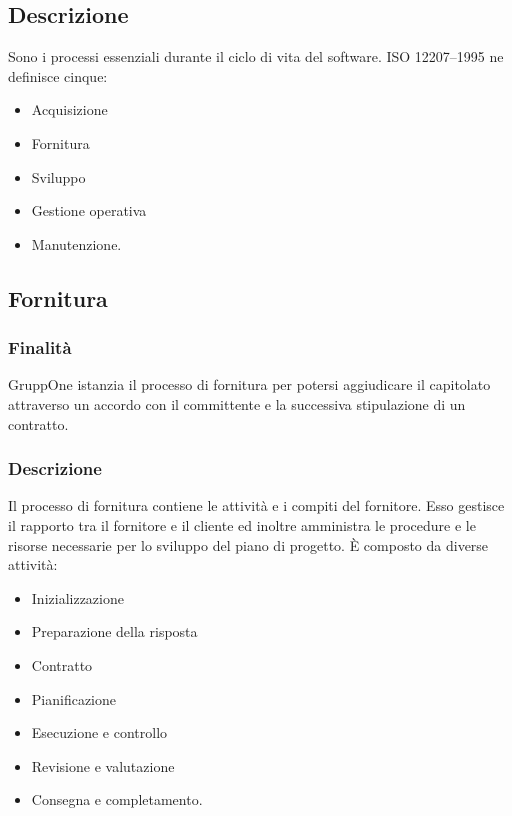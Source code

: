 \documentclass[../norme-di-progetto.tex]{subfiles}
\begin{document}
\subsection{Descrizione}%
\label{sub:processi_primari/descrizione}
Sono i processi essenziali durante il ciclo di vita del software. ISO 12207--1995 ne definisce cinque:

\begin{itemize}
  \item Acquisizione
  \item Fornitura
  \item Sviluppo
  \item Gestione operativa
  \item Manutenzione.
\end{itemize}

\subsection{Fornitura}%
\label{sub:fornitura}

\subsubsection{Finalità}%
\label{subs:fornitura/finalita}

GruppOne istanzia il processo di fornitura per potersi aggiudicare il capitolato attraverso un accordo con il committente e la successiva stipulazione di un contratto.

\subsubsection{Descrizione}%
\label{subs:fornitura/descrizione}

Il processo di fornitura contiene le attività e i compiti del fornitore. Esso gestisce il rapporto tra il fornitore e il cliente ed inoltre amministra le procedure e le risorse necessarie per lo sviluppo del piano di progetto. È composto da diverse attività:

\begin{itemize}
  \item Inizializzazione
  \item Preparazione della risposta
  \item Contratto
  \item Pianificazione
  \item Esecuzione e controllo
  \item Revisione e valutazione
  \item Consegna e completamento.
\end{itemize}
\end{document}
